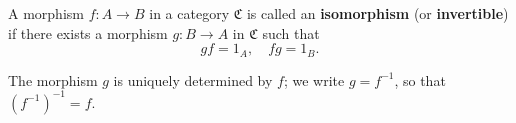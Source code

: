 A morphism $f: A \to B$ in a category $\mathfrak{C}$ is called an \textbf{isomorphism} (or \textbf{invertible}) if there exists a morphism $g: B \to A$ in $\mathfrak{C}$ such that
$$gf = 1_A, \quad fg = 1_B.$$

The morphism $g$ is uniquely determined by $f$; we write $g = f^{-1}$, so that $(f^{-1})^{-1} = f$.
